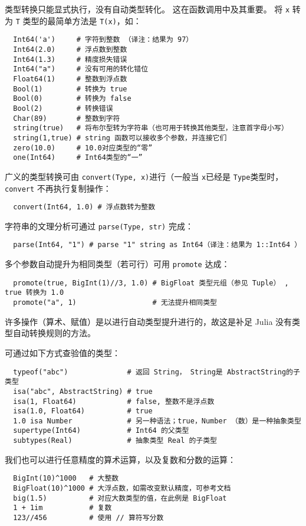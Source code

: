 \documentclass[10pt,a4paper]{article}
\begin{document}
类型转换只能显式执行，没有自动类型转化。
这在函数调用中及其重要。
将 \lstinline|x| 转为 \lstinline|T| 类型的最简单方法是 \lstinline|T(x)|，如：
\begin{lstlisting}
  Int64('a')     # 字符到整数 （译注：结果为 97）
  Int64(2.0)     # 浮点数到整数
  Int64(1.3)     # 精度损失错误
  Int64("a")     # 没有可用的转化错位
  Float64(1)     # 整数到浮点数
  Bool(1)        # 转换为 true
  Bool(0)        # 转换为 false
  Bool(2)        # 转换错误
  Char(89)       # 整数到字符
  string(true)   # 将布尔型转为字符串（也可用于转换其他类型，注意首字母小写）
  string(1,true) # string 函数可以接收多个参数，并连接它们
  zero(10.0)     # 10.0对应类型的“零”
  one(Int64)     # Int64类型的“一”
\end{lstlisting}
广义的类型转换可由 \lstinline|convert(Type, x)|进行（一般当 \lstinline|x|已经是 \lstinline|Type|类型时， \lstinline|convert| 不再执行复制操作：
\begin{lstlisting}
  convert(Int64, 1.0) # 浮点数转为整数
\end{lstlisting}
字符串的文理分析可通过 \lstinline|parse(Type, str)| 完成：
\begin{lstlisting}
  parse(Int64, "1") # parse "1" string as Int64（译注：结果为 1::Int64 ）
\end{lstlisting}
多个参数自动提升为相同类型（若可行）可用 \lstinline|promote| 达成：
\begin{lstlisting}
  promote(true, BigInt(1)//3, 1.0) # BigFloat 类型元组（参见 Tuple） , true 转换为 1.0
  promote("a", 1)                  # 无法提升相同类型
\end{lstlisting}
许多操作（算术、赋值）是以进行自动类型提升进行的，故这是补足 Julia 没有类型自动转换规则的方法。

可通过如下方式查验值的类型：
\begin{lstlisting}
  typeof("abc")              # 返回 String， String是 AbstractString的子类型
  isa("abc", AbstractString) # true
  isa(1, Float64)            # false, 整数不是浮点数
  isa(1.0, Float64)          # true
  1.0 isa Number             # 另一种语法；true，Number （数）是一种抽象类型
  supertype(Int64)           # Int64 的父类型
  subtypes(Real)             # 抽象类型 Real 的子类型
\end{lstlisting}
我们也可以进行任意精度的算术运算，以及复数和分数的运算：
\begin{lstlisting}
  BigInt(10)^1000   # 大整数
  BigFloat(10)^1000 # 大浮点数，如需改变默认精度，可参考文档
  big(1.5)          # 对应大数类型的值，在此例是 BigFloat
  1 + 1im           # 复数
  123//456          # 使用 // 算符写分数
\end{lstlisting}
\end{document}
